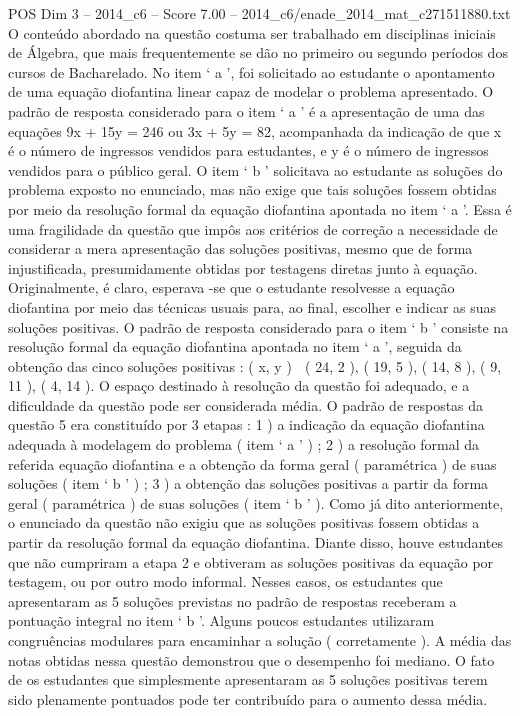 \begin{textsample}{POS Dim 3 – 2014\_c6 – Score 7.00 – 2014\_c6/enade\_2014\_mat\_c271511880.txt}
O conteúdo abordado na questão costuma ser trabalhado em disciplinas iniciais de Álgebra, que mais frequentemente se dão no primeiro ou segundo períodos dos cursos de Bacharelado.
No item ‘ a ’, foi solicitado ao estudante o apontamento de uma equação diofantina linear capaz de modelar o problema apresentado.
O padrão de resposta considerado para o item ‘ a ’ é a apresentação de uma das equações 9x + 15y = 246 ou 3x + 5y = 82, acompanhada da indicação de que x é o número de ingressos vendidos para estudantes, e y é o número de ingressos vendidos para o público geral.
O item ‘ b ’ solicitava ao estudante as soluções do problema exposto no enunciado, mas não exige que tais soluções fossem obtidas por meio da resolução formal da equação diofantina apontada no item ‘ a ’.
Essa é uma fragilidade da questão que impôs aos critérios de correção a necessidade de considerar a mera apresentação das soluções positivas, mesmo que de forma injustificada, presumidamente obtidas por testagens diretas junto à equação.
Originalmente, é claro, esperava -se que o estudante resolvesse a equação diofantina por meio das técnicas usuais para, ao final, escolher e indicar as suas soluções positivas.
O padrão de resposta considerado para o item ‘ b ’ consiste na resolução formal da equação diofantina apontada no item ‘ a ’, seguida da obtenção das cinco soluções positivas : ( x, y )  ( 24, 2 ), ( 19, 5 ), ( 14, 8 ), ( 9, 11 ), ( 4, 14 ).
O espaço destinado à resolução da questão foi adequado, e a dificuldade da questão pode ser considerada média.
O padrão de respostas da questão 5 era constituído por 3 etapas : 1 ) a indicação da equação diofantina adequada à modelagem do problema ( item ‘ a ’ ) ; 2 ) a resolução formal da referida equação diofantina e a obtenção da forma geral ( paramétrica ) de suas soluções ( item ‘ b ’ ) ; 3 ) a obtenção das soluções positivas a partir da forma geral ( paramétrica ) de suas soluções ( item ‘ b ’ ).
Como já dito anteriormente, o enunciado da questão não exigiu que as soluções positivas fossem obtidas a partir da resolução formal da equação diofantina.
Diante disso, houve estudantes que não cumpriram a etapa 2 e obtiveram as soluções positivas da equação por testagem, ou por outro modo informal.
Nesses casos, os estudantes que apresentaram as 5 soluções previstas no padrão de respostas receberam a pontuação integral no item ‘ b ’.
Alguns poucos estudantes utilizaram congruências modulares para encaminhar a solução ( corretamente ).
A média das notas obtidas nessa questão demonstrou que o desempenho foi mediano.
O fato de os estudantes que simplesmente apresentaram as 5 soluções positivas terem sido plenamente pontuados pode ter contribuído para o aumento dessa média.

\end{textsample}
